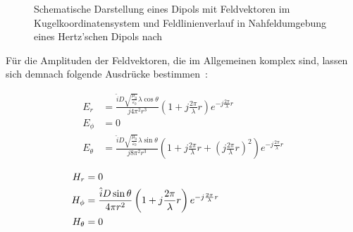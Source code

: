 \begin{figure}
\begin{subfigure}[b]{0.4\textwidth}
        \caption{\label{subfig:2_Feldverlauf_Hertz-Dipol}}
    \end{subfigure}
    \caption[Schematische Darstellung eines Dipols und Nahfeldumgebung eines Hertz'schen Dipols]{Schematische Darstellung eines Dipols mit Feldvektoren im Kugelkoordinatensystem und Feldlinienverlauf in Nahfeldumgebung eines Hertz'schen Dipols nach~\cite{EMV}}
    \label{fig:2_Feldverlauf}
\end{figure}

Für die Amplituden der Feldvektoren, die im Allgemeinen komplex sind, lassen sich demnach folgende Ausdrücke bestimmen~\cite{Antenna_Theory, EMV}:

\begin{subequations}
\label{eq:2_elektrische_Feldvektoren}
    \begin{align}
        E_r &= \frac{\hat i D \sqrt{\frac{\mu_0}{\varepsilon_0}} \lambda \cos{\theta}}{j 4 \pi^2 r^3}\left(1+ j\frac{2\pi}{\lambda}r\right)e^{-j\frac{2\pi}{\lambda}r} \label{subeq:2_E-Feld1} \\
        E_{\phi} &= 0 \label{subeq:2_E-Feld2} \\
        E_{\theta} &= \frac{\hat i D \sqrt{\frac{\mu_0}{\varepsilon_0}} \lambda \sin{\theta}}{j 8 \pi^2 r^3}\left(1+ j\frac{2\pi}{\lambda}r + \left(j\frac{2\pi}{\lambda}r\right)^2\right)e^{-j\frac{2\pi}{\lambda}r} \label{subeq:2_E-Feld3}
    \end{align}
\end{subequations}

\begin{subequations}
\label{eq:2_magnetische_Feldvektoren}
    \begin{align}
        H_r &= 0 \hphantom{\text{DiesIstEinLangesPlatzhalterwort1111111111}} \label{subeq:2_H-Feld1}\\
        H_{\phi} &= \frac{\hat i D \sin{\theta}}{4 \pi r^2}\left(1+j\frac{2\pi}{\lambda}r\right)e^{-j\frac{2\pi}{\lambda}r} \label{subeq:2_H-Feld2}\\
        H_{\theta} &= 0
    \end{align}
\end{subequations}

